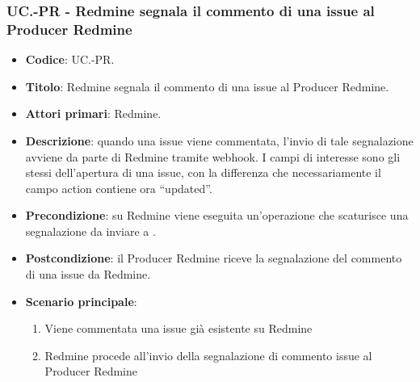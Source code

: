 \subsubsection{UC\theuccount.\thesubuccount-PR - Redmine segnala il commento di una issue al Producer Redmine}
\begin{itemize}
	\item \textbf{Codice}: UC\theuccount.\thesubuccount-PR.
	\item \textbf{Titolo}: Redmine segnala il commento di una issue al Producer Redmine.
	\item \textbf{Attori primari}: Redmine.
	\item \textbf{Descrizione}: quando una issue viene commentata, l'invio di tale segnalazione
	avviene da parte di Redmine tramite webhook.
	I campi di interesse sono gli stessi dell'apertura di una issue, con la differenza che necessariamente il campo action contiene ora ``updated''.
		\item \textbf{Precondizione}: su Redmine viene eseguita un'operazione che scaturisce una
    segnalazione da inviare a \progetto.
	\item \textbf{Postcondizione}: il Producer Redmine riceve la segnalazione del commento di una issue da Redmine.
	\item \textbf{Scenario principale}:
	\begin{enumerate}
		\item Viene commentata una issue già esistente su Redmine
		\item Redmine procede all'invio della segnalazione di commento issue al Producer Redmine
	\end{enumerate}

\end{itemize}
